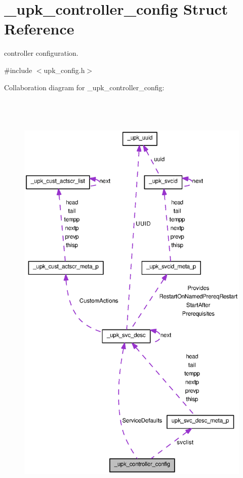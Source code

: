 \section{\_\-upk\_\-controller\_\-config Struct Reference}
\label{struct__upk__controller__config}


controller configuration.  




{\ttfamily \#include $<$upk\_\-config.h$>$}



Collaboration diagram for \_\-upk\_\-controller\_\-config:
\nopagebreak
\begin{figure}[H]
\begin{center}
\leavevmode
\includegraphics[height=600pt]{struct__upk__controller__config__coll__graph}
\end{center}
\end{figure}
